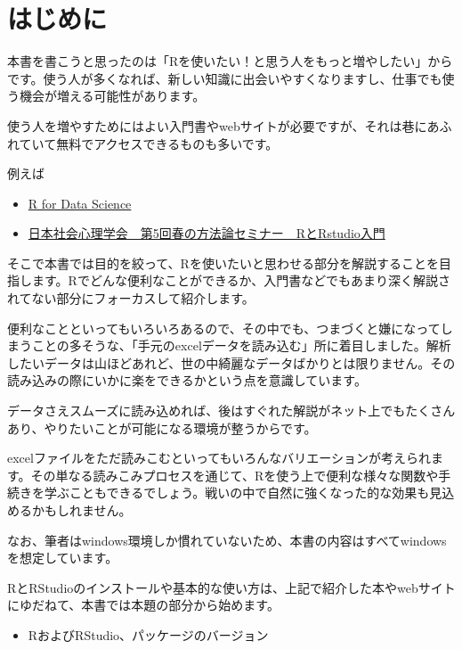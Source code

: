 \documentclass[
  xelatex,ja=standard, b5paper]{bxjsbook}
\author{}
\date{\vspace{-2.5em}}
\providecommand{\tightlist}{%
  \setlength{\itemsep}{0pt}\setlength{\parskip}{0pt}}
\begin{document}
{
\setcounter{tocdepth}{1}
\tableofcontents
}
\hypertarget{hajimeni}{%
\chapter*{はじめに}\label{hajimeni}}

本書を書こうと思ったのは「Rを使いたい！と思う人をもっと増やしたい」からです。使う人が多くなれば、新しい知識に出会いやすくなりますし、仕事でも使う機会が増える可能性があります。

使う人を増やすためにはよい入門書やwebサイトが必要ですが、それは巷にあふれていて無料でアクセスできるものも多いです。

例えば

\begin{itemize}
\tightlist
\item
  \href{https://r4ds.had.co.nz/}{R for Data Science}\\
\item
  \href{https://kazutan.github.io/JSSP2018_spring/index.html}{日本社会心理学会　第5回春の方法論セミナー　RとRstudio入門}
\end{itemize}

そこで本書では目的を絞って、Rを使いたいと思わせる部分を解説することを目指します。Rでどんな便利なことができるか、入門書などでもあまり深く解説されてない部分にフォーカスして紹介します。

便利なことといってもいろいろあるので、その中でも、つまづくと嫌になってしまうことの多そうな、「手元のexcelデータを読み込む」所に着目しました。解析したいデータは山ほどあれど、世の中綺麗なデータばかりとは限りません。その読み込みの際にいかに楽をできるかという点を意識しています。

データさえスムーズに読み込めれば、後はすぐれた解説がネット上でもたくさんあり、やりたいことが可能になる環境が整うからです。

excelファイルをただ読みこむといってもいろんなバリエーションが考えられます。その単なる読みこみプロセスを通じて、Rを使う上で便利な様々な関数や手続きを学ぶこともできるでしょう。戦いの中で自然に強くなった的な効果も見込めるかもしれません。

なお、筆者はwindows環境しか慣れていないため、本書の内容はすべてwindowsを想定しています。

RとRStudioのインストールや基本的な使い方は、上記で紹介した本やwebサイトにゆだねて、本書では本題の部分から始めます。

\begin{itemize}
\tightlist
\item
  RおよびRStudio、パッケージのバージョン
\end{itemize}
\end{document}
